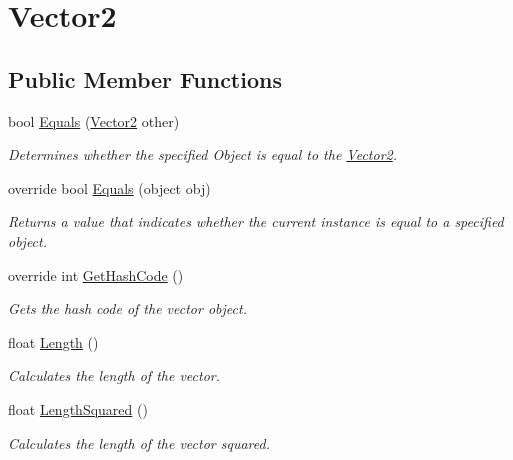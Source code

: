 \hypertarget{structMicrosoft_1_1Xna_1_1Framework_1_1Vector2}{}\section{Vector2}
\label{structMicrosoft_1_1Xna_1_1Framework_1_1Vector2}
\subsection*{Public Member Functions}
\begin{DoxyCompactItemize}
\item 
bool \hyperlink{structMicrosoft_1_1Xna_1_1Framework_1_1Vector2_a560fec6519baca4066d1705a256439ce}{Equals} (\hyperlink{structMicrosoft_1_1Xna_1_1Framework_1_1Vector2}{Vector2} other)
\begin{DoxyCompactList}\small\item\em Determines whether the specified Object is equal to the \hyperlink{structMicrosoft_1_1Xna_1_1Framework_1_1Vector2}{Vector2}.\end{DoxyCompactList}\item 
override bool \hyperlink{structMicrosoft_1_1Xna_1_1Framework_1_1Vector2_aadf763f0213fc2f3875230b06bb0b6cf}{Equals} (object obj)
\begin{DoxyCompactList}\small\item\em Returns a value that indicates whether the current instance is equal to a specified object.\end{DoxyCompactList}\item 
override int \hyperlink{structMicrosoft_1_1Xna_1_1Framework_1_1Vector2_a77e1afa2b6dee1ed3640da81d7407b42}{Get\+Hash\+Code} ()
\begin{DoxyCompactList}\small\item\em Gets the hash code of the vector object.\end{DoxyCompactList}\item 
float \hyperlink{structMicrosoft_1_1Xna_1_1Framework_1_1Vector2_aad3844ad28d7ac4d504313c0037e11ac}{Length} ()
\begin{DoxyCompactList}\small\item\em Calculates the length of the vector.\end{DoxyCompactList}\item 
float \hyperlink{structMicrosoft_1_1Xna_1_1Framework_1_1Vector2_a69c72fec33d724953b523e6997682e9c}{Length\+Squared} ()
\begin{DoxyCompactList}\small\item\em Calculates the length of the vector squared.\end{DoxyCompactList}\item 

\end{DoxyCompactItemize}

